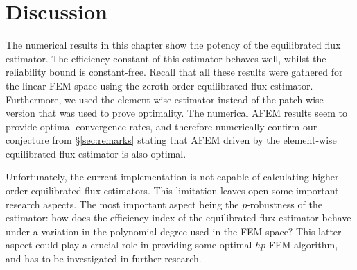 \documentclass[thesis.tex]{subfiles}
\begin{document}
\section{Discussion}
The numerical results in this chapter show the potency of the equilibrated flux estimator. The efficiency constant of this
estimator behaves well, whilst the reliability bound is constant-free. Recall that all these results
were gathered for the linear FEM space using the zeroth order equilibrated flux estimator. Furthermore, we used
the element-wise estimator instead of the patch-wise version that was used to prove optimality. The numerical AFEM results
seem to provide optimal convergence rates, and therefore numerically confirm our conjecture from \S\ref{sec:remarks} stating
that AFEM driven by the element-wise equilibrated flux estimator is also optimal.

Unfortunately, the current implementation is not capable of calculating higher order equilibrated flux estimators. This limitation
leaves open some important research aspects. The most important aspect being the $p$-robustness of the estimator:
how does the efficiency index of the equilibrated flux estimator behave under a variation in the polynomial degree used in the FEM space? 
This latter aspect could play a crucial role in providing some optimal $hp$-FEM algorithm, and has to be investigated in further research.
\end{document}
